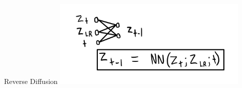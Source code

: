 \begin{frame}{Reverse Diffusion}
    \centering
    \includegraphics[height=0.7\textheight,width=0.7\textwidth,keepaspectratio]{images/mm_reverse.jpeg}
\end{frame}








